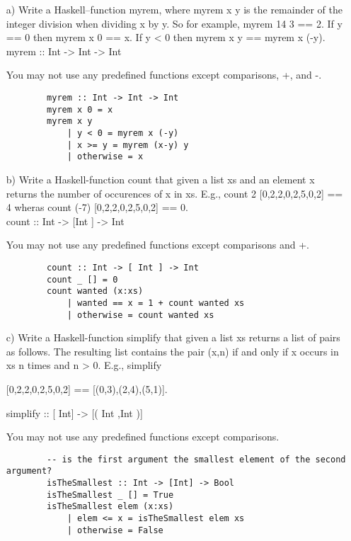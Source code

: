 \documentclass[10pt]{article}
\begin{document}
\begin{itemize}
	\item[a)] Write a Haskell–function myrem, where myrem x y is the remainder of the integer division when dividing
x by y. So for example, myrem 14 3 == 2. If y == 0 then myrem x 0 == x. If y < 0 then myrem x y
== myrem x (-y).
	myrem :: Int -> Int -> Int

	You may not use any predefined functions except comparisons, +, and -.

	
	\begin{addmargin}[0em]{2em}
		\begin{lstlisting}
		myrem :: Int -> Int -> Int
		myrem x 0 = x
		myrem x y
		    | y < 0 = myrem x (-y)
		    | x >= y = myrem (x-y) y
		    | otherwise = x
		\end{lstlisting}
	\end{addmargin}
	
	\item[b)] Write a Haskell-function count that given a list xs and an element x returns the number of occurences
of x in xs. E.g., count 2 [0,2,2,0,2,5,0,2] == 4 wheras count (-7) [0,2,2,0,2,5,0,2] == 0.\\
	count :: Int -> [Int ] -> Int

	You may not use any predefined functions except comparisons and +.
	
	\begin{addmargin}[0em]{2em}
		\begin{lstlisting}
		count :: Int -> [ Int ] -> Int
		count _ [] = 0
		count wanted (x:xs)
		    | wanted == x = 1 + count wanted xs
		    | otherwise = count wanted xs
		\end{lstlisting}
	\end{addmargin}

	
	\item[c)] Write a Haskell-function simplify that given a list xs returns a list of pairs as follows. The resulting list contains the pair (x,n) if and only if x occurs in xs n times and n > 0. E.g., simplify

	[0,2,2,0,2,5,0,2] == [(0,3),(2,4),(5,1)].

	simplify :: [ Int] -> [( Int ,Int )]

	You may not use any predefined functions except comparisons.
	
	\begin{addmargin}[0em]{2em}
		\begin{lstlisting}
		-- is the first argument the smallest element of the second argument?
		isTheSmallest :: Int -> [Int] -> Bool
		isTheSmallest _ [] = True
		isTheSmallest elem (x:xs)
			| elem <= x = isTheSmallest elem xs
			| otherwise = False
		

\end{lstlisting}
\end{addmargin}
\end{itemize}
\end{document}
